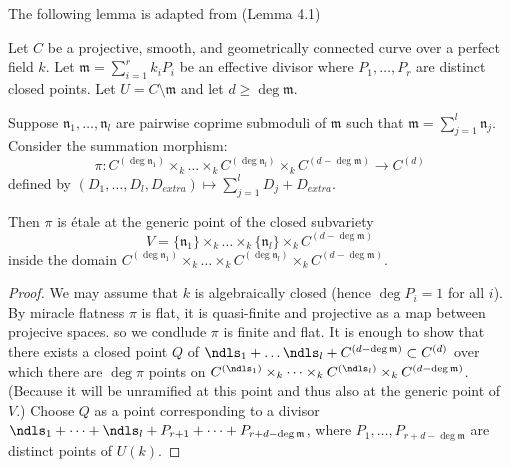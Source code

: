 The following lemma is adapted from \cite{takeuchi2019blow} (Lemma 4.1)
\begin{lemma}\label{lemma:takeuchi_lemma}
     Let $C$ be a projective, smooth, and geometrically connected curve over a perfect field $k$. 
     Let $\mathfrak{m} = \sum_{i=1}^{r} k_i P_i$ be an effective divisor where $P_1, \dots, P_r$ are distinct closed points. 
     Let $U = C \setminus \mathfrak{m}$ and let $d \geq \deg \mathfrak{m}$.

     Suppose $\mathfrak{n}_1, \dots, \mathfrak{n}_l$ are pairwise coprime submoduli of $\mathfrak{m}$ such that $\mathfrak{m} = \sum_{j=1}^l \mathfrak{n}_j$. 
     Consider the summation morphism:
     \[
     \pi : C^{(\deg \mathfrak{n}_1)} \times_k \dots \times_k C^{(\deg \mathfrak{n}_l)} \times_k C^{(d - \deg \mathfrak{m})} \longrightarrow C^{(d)}
     \]
     defined by $(D_1, \dots, D_l, D_{extra}) \mapsto \sum_{j=1}^l D_j + D_{extra}$.

     Then $\pi$ is étale at the generic point of the closed subvariety 
     \[
     V = \{\mathfrak{n}_1\} \times_k \dots \times_k \{\mathfrak{n}_l\} \times_k C^{(d - \deg \mathfrak{m})}
     \]
     inside the domain $C^{(\deg \mathfrak{n}_1)} \times_k \dots \times_k C^{(\deg \mathfrak{n}_l)} \times_k C^{(d - \deg \mathfrak{m})}$.

\begin{proof}
     We may assume that $k$ is algebraically closed (hence $\deg P_i = 1$ for all $i$). By miracle flatness $\pi$ is flat, it is quasi-finite and projective as a map between projecive spaces.
     so we condlude $\pi$ is finite and flat. 
     It is enough to show that there exists a closed point $Q$ of $\ndls_1 + \dots \ndls_l + C^{(d - \deg \mathfrak{m})} \subset C^{(d)}$ 
     over which there are $\deg \pi$ points on $C^{(\ndls_1)} \times_k \dots \times_k C^{(\ndls_l)} \times_k C^{(d - \deg \mathfrak{m})}$. (Because it will be unramified 
     at this point and thus also at the generic point of $V$.)
     Choose $Q$ as a point corresponding to a divisor
     $\ndls_1 + \dots + \ndls_l + P_{r+1} + \dots + P_{r+d - \deg \mathfrak{m}}$, where $P_1, \dots, P_{r+d - \deg \mathfrak{m}}$ are distinct points of $U(k)$.
\end{proof}     
\end{lemma}

